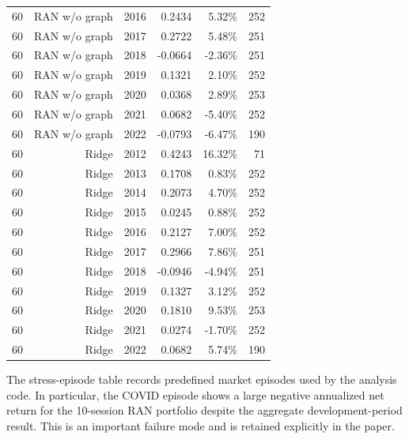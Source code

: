 \documentclass[10pt]{article}
\begin{document}
\begin{longtable}{lrrrrr}
60 & RAN w/o graph & 2016 & 0.2434 & 5.32\% & 252 \\
60 & RAN w/o graph & 2017 & 0.2722 & 5.48\% & 251 \\
60 & RAN w/o graph & 2018 & -0.0664 & -2.36\% & 251 \\
60 & RAN w/o graph & 2019 & 0.1321 & 2.10\% & 252 \\
60 & RAN w/o graph & 2020 & 0.0368 & 2.89\% & 253 \\
60 & RAN w/o graph & 2021 & 0.0682 & -5.40\% & 252 \\
60 & RAN w/o graph & 2022 & -0.0793 & -6.47\% & 190 \\
60 & Ridge & 2012 & 0.4243 & 16.32\% & 71 \\
60 & Ridge & 2013 & 0.1708 & 0.83\% & 252 \\
60 & Ridge & 2014 & 0.2073 & 4.70\% & 252 \\
60 & Ridge & 2015 & 0.0245 & 0.88\% & 252 \\
60 & Ridge & 2016 & 0.2127 & 7.00\% & 252 \\
60 & Ridge & 2017 & 0.2966 & 7.86\% & 251 \\
60 & Ridge & 2018 & -0.0946 & -4.94\% & 251 \\
60 & Ridge & 2019 & 0.1327 & 3.12\% & 252 \\
60 & Ridge & 2020 & 0.1810 & 9.53\% & 253 \\
60 & Ridge & 2021 & 0.0274 & -1.70\% & 252 \\
60 & Ridge & 2022 & 0.0682 & 5.74\% & 190 \\
\bottomrule
\end{longtable}
\endgroup

The stress-episode table records predefined market episodes used by the analysis code. In particular, the COVID episode shows a large negative annualized net return for the 10-session RAN portfolio despite the aggregate development-period result. This is an important failure mode and is retained explicitly in the paper.
\end{document}
